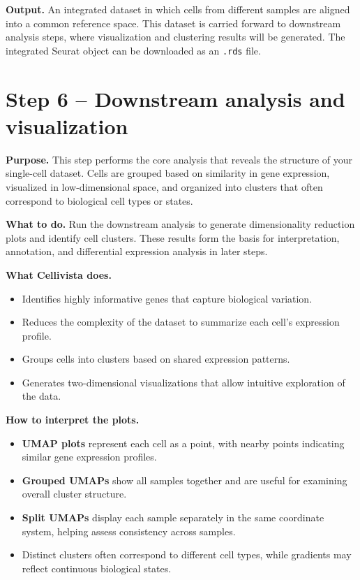 \documentclass[11pt]{article}
\begin{document}
\textbf{Output.}  
An integrated dataset in which cells from different samples are aligned into a common reference space. This dataset is carried forward to downstream analysis steps, where visualization and clustering results will be generated. The integrated Seurat object can be downloaded as an \texttt{.rds} file.

\section{Step 6 -- Downstream analysis and visualization}

\textbf{Purpose.}  
This step performs the core analysis that reveals the structure of your single-cell dataset. Cells are grouped based on similarity in gene expression, visualized in low-dimensional space, and organized into clusters that often correspond to biological cell types or states.

\textbf{What to do.}  
Run the downstream analysis to generate dimensionality reduction plots and identify cell clusters. These results form the basis for interpretation, annotation, and differential expression analysis in later steps.

\textbf{What Cellivista does.}
\begin{itemize}[leftmargin=*,nosep]
\item Identifies highly informative genes that capture biological variation.
\item Reduces the complexity of the dataset to summarize each cell’s expression profile.
\item Groups cells into clusters based on shared expression patterns.
\item Generates two-dimensional visualizations that allow intuitive exploration of the data.
\end{itemize}

\textbf{How to interpret the plots.}
\begin{itemize}[leftmargin=*,nosep]
\item \textbf{UMAP plots} represent each cell as a point, with nearby points indicating similar gene expression profiles.
\item \textbf{Grouped UMAPs} show all samples together and are useful for examining overall cluster structure.
\item \textbf{Split UMAPs} display each sample separately in the same coordinate system, helping assess consistency across samples.
\item Distinct clusters often correspond to different cell types, while gradients may reflect continuous biological states.
\end{itemize}
\end{document}
